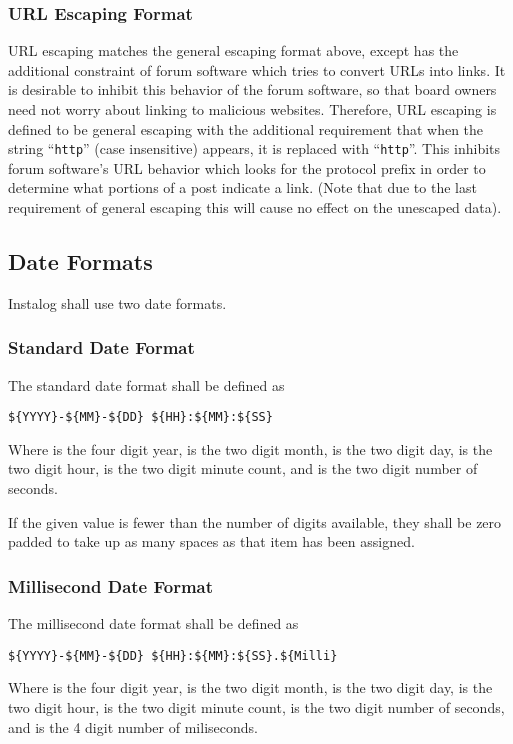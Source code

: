 \subsubsection{URL Escaping Format} \label{urlescape}
URL escaping matches the general escaping format above, except has the
additional constraint of forum software which tries to convert URLs into links.
It is desirable to inhibit this behavior of the forum software, so that board
owners need not worry about linking to malicious websites. Therefore, URL
escaping is defined to be general escaping with the additional requirement that
when the string ``\texttt{http}'' (case insensitive) appears, it is replaced
with ``\texttt{htt}\texttt{p}''. This inhibits forum
software's URL behavior which looks for the protocol prefix in order to
determine what portions of a post indicate a link. (Note that due to the last
requirement of general escaping this will cause no effect on the unescaped
data).

\subsection{Date Formats}
Instalog shall use two date formats.

\subsubsection{Standard Date Format} \label{stddate}
The standard date format shall be defined as
\begin{verbatim}
${YYYY}-${MM}-${DD} ${HH}:${MM}:${SS}
\end{verbatim}
Where  is the four digit year,  is the two digit month,
 is the two digit day,  is the two digit hour,  is the
two digit minute count, and  is the two digit number of seconds.

If the given value is fewer than the number of digits available, they shall be
zero padded to take up as many spaces as that item has been assigned.

\subsubsection{Millisecond Date Format} \label{millidate}
The millisecond date format shall be defined as
\begin{verbatim}
${YYYY}-${MM}-${DD} ${HH}:${MM}:${SS}.${Milli}
\end{verbatim}
Where  is the four digit year,  is the two digit month,
 is the two digit day,  is the two digit hour,  is the
two digit minute count,  is the two digit number of seconds, and
 is the 4 digit number of miliseconds.

